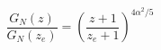 \begin{equation}
\frac{G_N(z)}{G_N(z_e)}=\left(\frac{z+1}{z_e+1}\right)^{4\alpha^2/5}
\end{equation}

